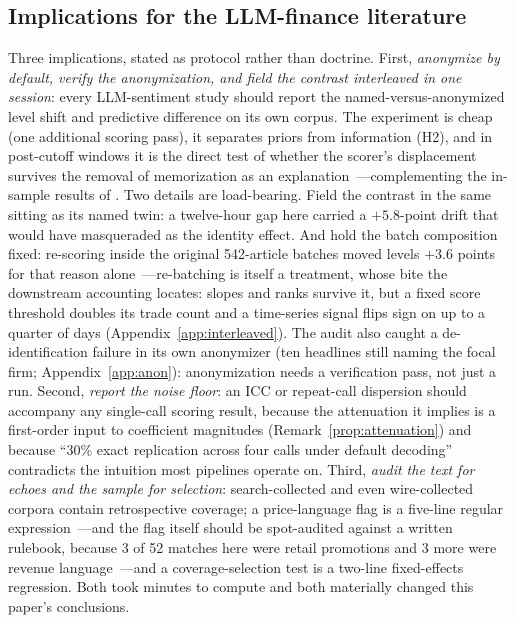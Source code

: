 \subsection{Implications for the LLM-finance literature}

Three implications, stated as protocol rather than doctrine. First, \emph{anonymize by default, verify the anonymization, and field the contrast interleaved in one session}: every LLM-sentiment study should report the named-versus-anonymized level shift and predictive difference on its own corpus. The experiment is cheap (one additional scoring pass), it separates priors from information (H2), and in post-cutoff windows it is the direct test of whether the scorer's displacement survives the removal of memorization as an explanation~---complementing the in-sample results of \citet{glasserman2023}. Two details are load-bearing. Field the contrast in the same sitting as its named twin: a twelve-hour gap here carried a $+5.8$-point drift that would have masqueraded as the identity effect. And hold the batch composition fixed: re-scoring inside the original 542-article batches moved levels $+3.6$ points for that reason alone~---re-batching is itself a treatment, whose bite the downstream accounting locates: slopes and ranks survive it, but a fixed score threshold doubles its trade count and a time-series signal flips sign on up to a quarter of days (Appendix~\ref{app:interleaved}). The audit also caught a de-identification failure in its own anonymizer (ten headlines still naming the focal firm; Appendix~\ref{app:anon}): anonymization needs a verification pass, not just a run. Second, \emph{report the noise floor}: an ICC or repeat-call dispersion should accompany any single-call scoring result, because the attenuation it implies is a first-order input to coefficient magnitudes (Remark~\ref{prop:attenuation}) and because ``30\% exact replication across four calls under default decoding'' contradicts the intuition most pipelines operate on. Third, \emph{audit the text for echoes and the sample for selection}: search-collected and even wire-collected corpora contain retrospective coverage; a price-language flag is a five-line regular expression~---and the flag itself should be spot-audited against a written rulebook, because 3 of 52 matches here were retail promotions and 3 more were revenue language~---and a coverage-selection test is a two-line fixed-effects regression. Both took minutes to compute and both materially changed this paper's conclusions.

